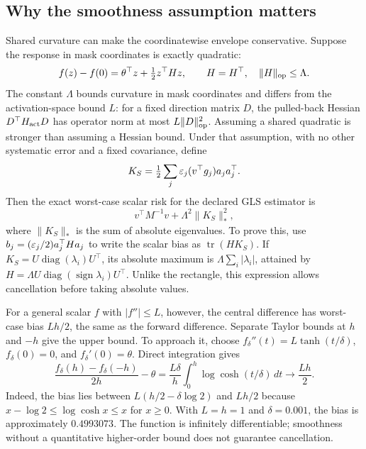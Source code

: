 \subsection{Why the smoothness assumption matters}

Shared curvature can make the coordinatewise envelope conservative. Suppose
the response in mask coordinates is exactly quadratic:
\begin{equation}\label{eq:bd-quadratic}
 f(z)-f(0)=\theta^\top z+\tfrac12z^\top Hz,
 \qquad H=H^\top,\quad \|H\|_{\rm op}\leq\Lambda.
\end{equation}
The constant $\Lambda$ bounds curvature in mask coordinates and differs from
the activation-space bound $L$: for a fixed direction matrix $D$, the
pulled-back Hessian $D^\top H_{\rm act}D$ has operator norm at most
$L\|D\|_{\rm op}^2$. Assuming a shared quadratic is stronger than assuming a
Hessian bound. Under that assumption, with no other systematic error and a
fixed covariance, define
\begin{equation}
 K_S=\tfrac12\sum_j\varepsilon_j(v^\top g_j)a_ja_j^\top.
\end{equation}
Then the exact worst-case scalar risk for the declared GLS estimator is
\begin{equation}\label{eq:bd-shared}
 v^\top M^{-1}v+\Lambda^2\|K_S\|_*^2,
\end{equation}
where $\|K_S\|_*$ is the sum of absolute eigenvalues. To prove this, use
$b_j=(\varepsilon_j/2)a_j^\top Ha_j$ to write the scalar bias as
$\operatorname{tr}(HK_S)$. If $K_S=U\operatorname{diag}(\lambda_i)U^\top$,
its absolute maximum is $\Lambda\sum_i|\lambda_i|$, attained by
$H=\Lambda U\operatorname{diag}(\operatorname{sign}\lambda_i)U^\top$.
Unlike the rectangle, this expression allows cancellation before taking
absolute values.

For a general scalar $f$ with $|f''|\leq L$, however, the central difference
has worst-case bias $Lh/2$, the same as the forward difference. Separate
Taylor bounds at $h$ and $-h$ give the upper bound. To approach it, choose
$f_\delta''(t)=L\tanh(t/\delta)$, $f_\delta(0)=0$, and
$f_\delta'(0)=\theta$. Direct integration gives
\begin{equation}\label{eq:bd-sharpness}
 \frac{f_\delta(h)-f_\delta(-h)}{2h}-\theta
 =\frac{L\delta}{h}\int_0^h\log\cosh(t/\delta)\,dt
 \longrightarrow\frac{Lh}{2}.
\end{equation}
Indeed, the bias lies between $L(h/2-\delta\log2)$ and $Lh/2$ because
$x-\log2\leq\log\cosh x\leq x$ for $x\geq0$. With $L=h=1$ and
$\delta=0.001$, the bias is approximately $0.4993073$. The function is
infinitely differentiable; smoothness without a quantitative higher-order
bound does not guarantee cancellation.

